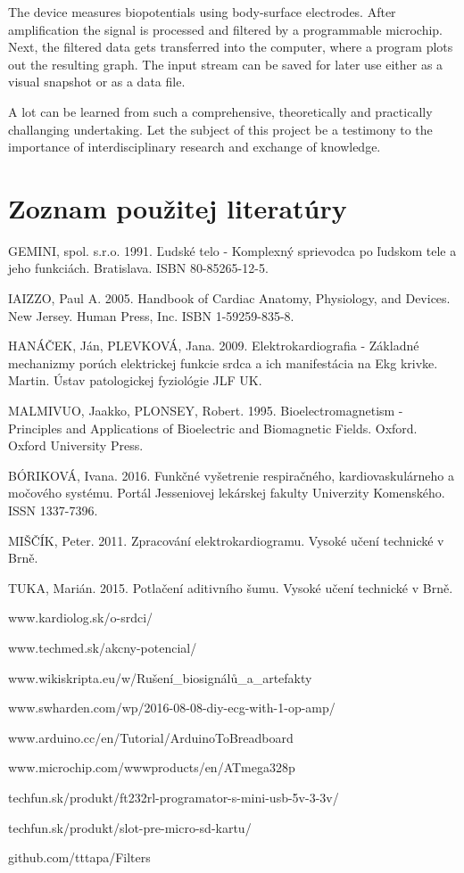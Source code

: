 \documentclass[titlepage,12pt]{article}
\begin{document}
The device measures biopotentials using body-surface electrodes. After amplification the signal is processed and filtered by a programmable microchip. Next, the filtered data gets transferred into the computer, where a program plots out the resulting graph. The input stream can be saved for later use either as a visual snapshot or as a data file.

A lot can be learned from such a comprehensive, theoretically and practically challanging undertaking. Let the subject of this project be a testimony to the importance of interdisciplinary research and exchange of knowledge.





\newpage
\section{Zoznam použitej literatúry}
\begin{enumerate}[label={[\arabic*]}]
\item GEMINI, spol. s.r.o. 1991. Ľudské telo - Komplexný sprievodca po ľudskom tele a jeho funkciách. Bratislava. ISBN 80-85265-12-5.
\item IAIZZO, Paul A. 2005. Handbook of Cardiac Anatomy, Physiology, and Devices. New Jersey. Human Press, Inc. ISBN 1-59259-835-8.
\item HANÁČEK, Ján, PLEVKOVÁ, Jana. 2009. Elektrokardiografia - Základné mechanizmy porúch elektrickej funkcie srdca a ich manifestácia na Ekg krivke. Martin. Ústav patologickej fyziológie JLF UK.
\item MALMIVUO, Jaakko, PLONSEY, Robert. 1995. Bioelectromagnetism - Principles and Applications of Bioelectric and Biomagnetic Fields. Oxford. Oxford University Press.
\item BÓRIKOVÁ, Ivana. 2016. Funkčné vyšetrenie respiračného, kardiovaskulárneho a močového systému. Portál Jesseniovej lekárskej fakulty Univerzity Komenského. ISSN 1337-7396.
\item MIŠČÍK, Peter. 2011. Zpracování elektrokardiogramu. Vysoké učení technické v Brně. 
\item TUKA, Marián. 2015. Potlačení aditivního šumu. Vysoké učení technické v Brně. 
\item www.kardiolog.sk/o-srdci/
\item www.techmed.sk/akcny-potencial/
\item www.wikiskripta.eu/w/Rušení\_biosignálů\_a\_artefakty
\item www.swharden.com/wp/2016-08-08-diy-ecg-with-1-op-amp/
\item www.arduino.cc/en/Tutorial/ArduinoToBreadboard
\item www.microchip.com/wwwproducts/en/ATmega328p
\item techfun.sk/produkt/ft232rl-programator-s-mini-usb-5v-3-3v/
\item techfun.sk/produkt/slot-pre-micro-sd-kartu/
\item github.com/tttapa/Filters
\end{enumerate}
\end{document}
